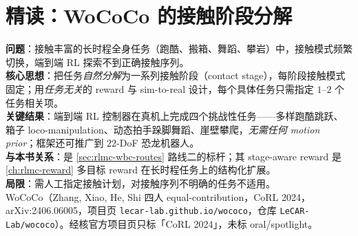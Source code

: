 \begin{practice}[本节动手]
\end{practice}

\section{精读：WoCoCo 的接触阶段分解}\label{sec:rlmc-wbc-wococo}

\begin{paper}\label{paper:rlmc-wbc-wococo}
\textbf{问题}：接触丰富的长时程全身任务（跑酷、搬箱、舞蹈、攀岩）中，接触模式频繁切换，端到端 RL 探索不到正确接触序列。\\
\textbf{核心思想}：把任务\emph{自然分解}为一系列接触阶段（contact stage），每阶段接触模式固定；用\emph{任务无关}的 reward 与 sim-to-real 设计，每个具体任务只需指定 $1$--$2$ 个任务相关项。\\
\textbf{关键结果}：端到端 RL 控制器在真机上完成四个挑战性任务——多样跑酷跳跃、箱子 loco-manipulation、动态拍手跺脚舞蹈、崖壁攀爬，\emph{无需任何 motion prior}；框架还可推广到 $22$-DoF 恐龙机器人。\\
\textbf{与本书关系}：是 \cref{sec:rlmc-wbc-routes} 路线二的标杆；其 stage-aware reward 是 \cref{ch:rlmc-reward} 多目标 reward 在长时程任务上的结构化扩展。\\
\textbf{局限}：需人工指定接触计划，对接触序列不明确的任务不适用。\\
WoCoCo（Zhang, Xiao, He, Shi 四人 equal-contribution，CoRL 2024，arXiv:2406.06005，项目页 \texttt{lecar-lab.\allowbreak github.\allowbreak io/\allowbreak wococo}，仓库 \texttt{LeCAR-Lab/\allowbreak wococo}）\cite{zhang2024wococo}。经核官方项目页只标「CoRL 2024」，未标 oral/spotlight。
\end{paper}

